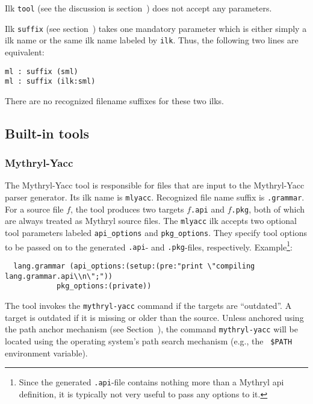 Ilk {\tt tool} (see the discussion is section~)
does not accept any parameters.

Ilk {\tt suffix} (see section~) takes one
mandatory parameter which is either simply a ilk name or the same
ilk name labeled by {\tt ilk}.  Thus, the following two lines are
equivalent:

\begin{verbatim}
ml : suffix (sml)
ml : suffix (ilk:sml)
\end{verbatim}

There are no recognized filename suffixes for these two ilks.

\subsection{Built-in tools}
\label{sec:builtin-tools}

\subsubsection{Mythryl-Yacc}

The Mythryl-Yacc tool is responsible for files that are input to the
Mythryl-Yacc parser generator.  Its ilk name is {\tt mlyacc}.  Recognized
file name suffix is {\tt .grammar}.  For a source file
$f$, the tool produces two targets $f${\tt .api} and $f${\tt .pkg},
both of which are always treated as Mythryl source files.  The {\tt mlyacc}
ilk accepts two optional tool parameters labeled {\tt api_options}
and {\tt pkg_options}.  They specify tool options to be passed on to
the generated {\tt .api}- and {\tt .pkg}-files, respectively.
Example\footnote{Since the generated {\tt .api}-file contains nothing
more than a Mythryl api definition, it is typically not very useful
to pass any options to it.}:

\begin{verbatim}
  lang.grammar (api_options:(setup:(pre:"print \"compiling lang.grammar.api\\n\";"))
            pkg_options:(private))
\end{verbatim}

The tool invokes the {\tt mythryl-yacc} command if the targets are
``outdated''.  A target is outdated if it is missing or older than the
source.  Unless anchored using the path anchor mechanism (see
Section~), the command {\tt mythryl-yacc} will be located
using the operating system's path search mechanism (e.g., the {\tt
\$PATH} environment variable).

